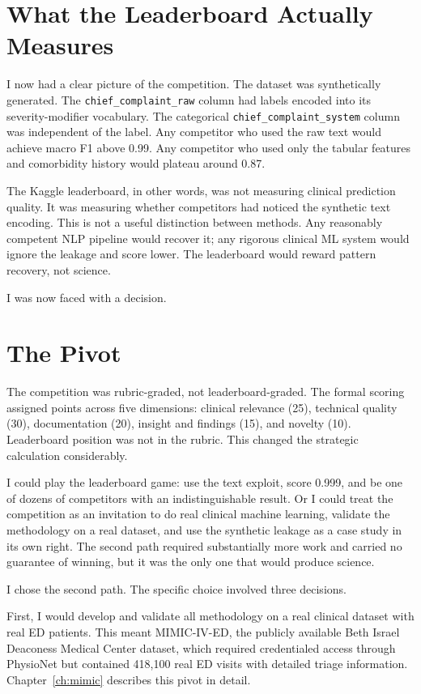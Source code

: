 \section{What the Leaderboard Actually Measures}

I now had a clear picture of the competition. The dataset was synthetically generated. The \texttt{chief\_complaint\_raw} column had labels encoded into its severity-modifier vocabulary. The categorical \texttt{chief\_complaint\_system} column was independent of the label. Any competitor who used the raw text would achieve macro F1 above 0.99. Any competitor who used only the tabular features and comorbidity history would plateau around 0.87.

The Kaggle leaderboard, in other words, was not measuring clinical prediction quality. It was measuring whether competitors had noticed the synthetic text encoding. This is not a useful distinction between methods. Any reasonably competent NLP pipeline would recover it; any rigorous clinical ML system would ignore the leakage and score lower. The leaderboard would reward pattern recovery, not science.

I was now faced with a decision.

\section{The Pivot}

The competition was rubric-graded, not leaderboard-graded. The formal scoring assigned points across five dimensions: clinical relevance (25), technical quality (30), documentation (20), insight and findings (15), and novelty (10). Leaderboard position was not in the rubric. This changed the strategic calculation considerably.

I could play the leaderboard game: use the text exploit, score 0.999, and be one of dozens of competitors with an indistinguishable result. Or I could treat the competition as an invitation to do real clinical machine learning, validate the methodology on a real dataset, and use the synthetic leakage as a case study in its own right. The second path required substantially more work and carried no guarantee of winning, but it was the only one that would produce science.

I chose the second path. The specific choice involved three decisions.

First, I would develop and validate all methodology on a real clinical dataset with real ED patients. This meant MIMIC-IV-ED, the publicly available Beth Israel Deaconess Medical Center dataset, which required credentialed access through PhysioNet but contained 418,100 real ED visits with detailed triage information. Chapter~\ref{ch:mimic} describes this pivot in detail.


